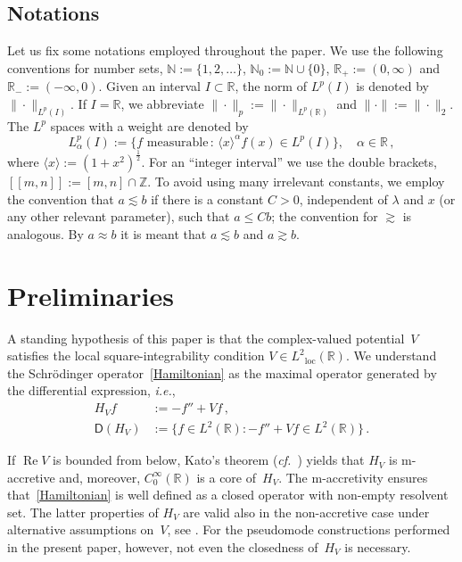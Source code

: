 \subsection*{Notations}
Let us fix some notations employed throughout the paper. 
We use the following conventions for number sets, 
${\mathbb{N}} := \{1,2,\dots\}$, ${\mathbb{N}}_0:={\mathbb{N}} \cup \{0\}$, ${\mathbb{R}}_+ := (0,\infty)$ and ${\mathbb{R}}_- := (-\infty,0)$.
Given an interval $I \subset {\mathbb{R}}$, 
the norm of $L^p(I)$ is denoted by $\|\cdot\|_{L^p(I)}$.
If $I={\mathbb{R}}$, we abbreviate $\|\cdot\|_p := \|\cdot\|_{L^p({\mathbb{R}})}$
and $\|\cdot\| := \|\cdot\|_2$.
The $L^p$ spaces with a weight are denoted by 
\begin{equation}
L^p_\alpha (I) := \{ f \text{ measurable} \, : \, \langle x \rangle^\alpha f(x) \in L^p(I) \}, \quad \alpha \in {\mathbb{R}} 
\,,
\end{equation}
where $\langle x \rangle := (1+x^2)^\frac12$.
For an ``integer interval'' we use the double brackets, $[[m,n]]:=[m,n] \cap {\mathbb{Z}}$. To avoid using many irrelevant constants, we employ the convention that $a \lesssim b$ if there is a constant $C>0$, independent of $\lambda$ and $x$ 
(or any other relevant parameter), such that $a \leq C b$; the convention for $\gtrsim$ is analogous. By $a \approx b$ it is meant that $a {\lesssim} b$ and $a {\gtrsim} b$. 

\section{Preliminaries}
\label{sec:prelim}
A standing hypothesis of this paper is that the complex-valued potential~$V$
satisfies the local square-integrability condition
$V \in {L^2}_\mathrm{loc}({\mathbb{R}})$.
We understand the Schr\"odinger operator~\eqref{Hamiltonian} 
as the maximal operator generated by the differential expression, 
{\emph{i.e.}},
\begin{equation}\label{Hamiltonian}
\begin{aligned}
H_V f &:= -f'' + V f \,,
\\
{\mathsf{D}}(H_V) &:=
\{f \in {L^2}({\mathbb{R}}) : -f'' + V f \in {L^2}({\mathbb{R}}) \}
\,.
\end{aligned}
\end{equation}

If ${\operatorname{Re}} V$ is bounded from below, 
Kato's theorem ({\emph{cf.}}~\cite[Sec.~VII.2.2]{Edmunds-Evans}) yields that 
$H_V$ is m-accretive and, moreover, ${{C_0^{\infty}({\mathbb{R}})}}$ is a core of~$H_V$.
The m-accretivity ensures that~\eqref{Hamiltonian}
is well defined as a closed operator with non-empty resolvent set.
The latter properties of $H_V$ are valid also in the non-accretive case 
under alternative assumptions on~$V$, see \cite{Krejcirik-2016}.
For the pseudomode constructions performed 
in the present paper, however, not even the closedness of~$H_V$ is necessary.
 
